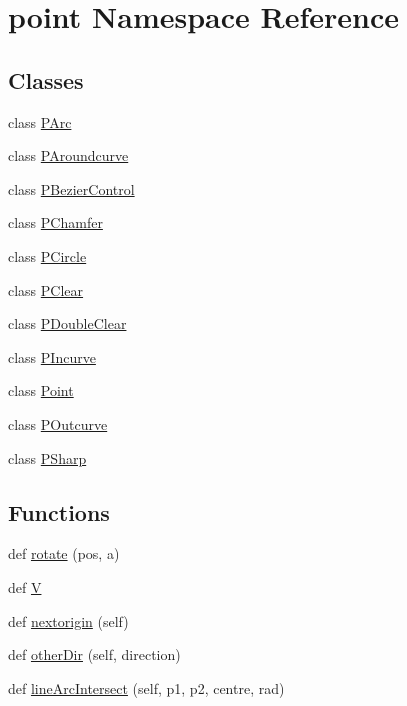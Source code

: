 \hypertarget{namespacepoint}{}\section{point Namespace Reference}
\label{namespacepoint}
\subsection*{Classes}
\begin{DoxyCompactItemize}
\item 
class \hyperlink{classpoint_1_1_p_arc}{P\+Arc}
\item 
class \hyperlink{classpoint_1_1_p_aroundcurve}{P\+Aroundcurve}
\item 
class \hyperlink{classpoint_1_1_p_bezier_control}{P\+Bezier\+Control}
\item 
class \hyperlink{classpoint_1_1_p_chamfer}{P\+Chamfer}
\item 
class \hyperlink{classpoint_1_1_p_circle}{P\+Circle}
\item 
class \hyperlink{classpoint_1_1_p_clear}{P\+Clear}
\item 
class \hyperlink{classpoint_1_1_p_double_clear}{P\+Double\+Clear}
\item 
class \hyperlink{classpoint_1_1_p_incurve}{P\+Incurve}
\item 
class \hyperlink{classpoint_1_1_point}{Point}
\item 
class \hyperlink{classpoint_1_1_p_outcurve}{P\+Outcurve}
\item 
class \hyperlink{classpoint_1_1_p_sharp}{P\+Sharp}
\end{DoxyCompactItemize}
\subsection*{Functions}
\begin{DoxyCompactItemize}
\item 
def \hyperlink{namespacepoint_a4b048a13e23e86c6f5d0a5f4c2ff3e15}{rotate} (pos, a)
\item 
def \hyperlink{namespacepoint_acc12f97640322a665d56d0233654a8ac}{V}
\item 
def \hyperlink{namespacepoint_acd0a0abb4fae2415425eadf1be1501f7}{nextorigin} (self)
\item 
def \hyperlink{namespacepoint_a0b5edbbdc66b95211a7202245613c176}{other\+Dir} (self, direction)
\item 
def \hyperlink{namespacepoint_aeaf6c17aef5ff8c0239b968250a24f4c}{line\+Arc\+Intersect} (self, p1, p2, centre, rad)
\end{DoxyCompactItemize}
